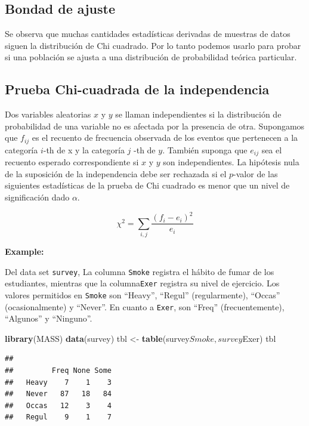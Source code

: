 \documentclass[]{article}
\newenvironment{Shaded}{\begin{snugshade}}{\end{snugshade}}
\newcommand{\KeywordTok}[1]{\textcolor[rgb]{0.13,0.29,0.53}{\textbf{{#1}}}}
\newcommand{\StringTok}[1]{\textcolor[rgb]{0.31,0.60,0.02}{{#1}}}
\newcommand{\NormalTok}[1]{{#1}}
\numberwithin{equation}{section}
\begin{document}
\subsection{Bondad de ajuste}\label{bondad-de-ajuste}

Se observa que muchas cantidades estadísticas derivadas de muestras de
datos siguen la distribución de Chi cuadrado. Por lo tanto podemos
usarlo para probar si una población se ajusta a una distribución de
probabilidad teórica particular.

\subsection{Prueba Chi-cuadrada de la
independencia}\label{prueba-chi-cuadrada-de-la-independencia}

Dos variables aleatorias \(x\) y \(y\) se llaman independientes si la
distribución de probabilidad de una variable no es afectada por la
presencia de otra. Supongamos que \(f_{ij}\) es el recuento de
frecuencia observada de los eventos que pertenecen a la categoría
\(i\)-th de x y la categoría \(j\) -th de \(y\). También suponga que
\(e_{ij}\) sea el recuento esperado correspondiente si \(x\) y \(y\) son
independientes. La hipótesis nula de la suposición de la independencia
debe ser rechazada si el \(p\)-valor de las siguientes estadísticas de
la prueba de Chi cuadrado es menor que un nivel de significación dado
\(\alpha\).

\[
  \chi^2 = \sum_{i,j}\frac{(f_i - e_i)^2}{e_i}
\]

\textbf{Example:}

Del data set \texttt{survey}, La columna \texttt{Smoke} registra el
hábito de fumar de los estudiantes, mientras que la columna\texttt{Exer}
registra su nivel de ejercicio. Los valores permitidos en \texttt{Smoke}
son ``Heavy'', ``Regul'' (regularmente), ``Occas'' (ocasionalmente) y
``Never''. En cuanto a \texttt{Exer}, son ``Freq'' (frecuentemente),
``Algunos'' y ``Ninguno''.

\begin{Shaded}
\begin{Highlighting}[]
\KeywordTok{library}\NormalTok{(MASS)}
\KeywordTok{data}\NormalTok{(survey)}
\NormalTok{tbl <-}\StringTok{ }\KeywordTok{table}\NormalTok{(survey$Smoke,survey$Exer)}
\NormalTok{tbl}
\end{Highlighting}
\end{Shaded}

\begin{verbatim}
##        
##         Freq None Some
##   Heavy    7    1    3
##   Never   87   18   84
##   Occas   12    3    4
##   Regul    9    1    7
\end{verbatim}
\end{document}
